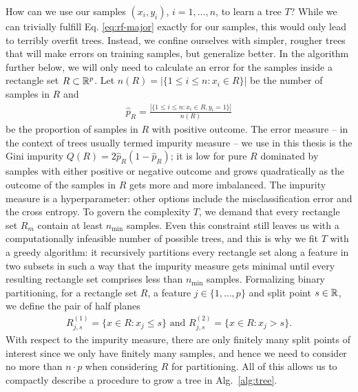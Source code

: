 How can we use our samples $(x_i, y_i)$, $i = 1, \ldots, n$, to learn a tree $T$? While we can 
trivially fulfill Eq. \eqref{eq:rf-major} exactly for our samples, this would only lead to terribly 
overfit trees. Instead, we confine ourselves with simpler, rougher trees that will make errors on 
training samples, but generalize better. 
In the algorithm further below, we will only need to calculate an error for the samples inside a 
rectangle set $R \subset \mathbb{R}^p$. Let $n(R) = |\{ 1 \leq i \leq n: x_i \in R \}|$ be the number of 
samples in $R$ and
\begin{align}
    \hat{p}_R = \frac{|\{ 1 \leq i \leq n: x_i \in R, y_i = 1 \}|}{n(R)}
\end{align}
be the proportion of samples in $R$ with positive outcome. The error measure -- in the context of 
trees usually termed impurity measure -- we use in this thesis
is the Gini impurity $Q(R) = 2 \hat{p}_R (1 - \hat{p}_R)$; it is low for pure $R$ dominated by 
samples with either positive or negative outcome and grows quadratically as the outcome of the 
samples in $R$ gets more and more imbalanced. The impurity measure is a hyperparameter: other 
options include the misclassification error and the cross entropy. To govern the complexity $T$,
we demand that every rectangle set $R_m$ contain at least $n_\text{min}$ samples. Even this 
constraint still leaves us with a computationally infeasible number of possible trees, and this is 
why we fit $T$ with a greedy algorithm: it recursively partitions every rectangle set along a 
feature in two subsets in such a way that the impurity measure gets minimal until every resulting 
rectangle set comprises less than $n_\text{min}$ samples. Formalizing binary partitioning, for a 
rectangle set $R$, a feature $j \in \{1, \ldots, p\}$ and split point $s \in \mathbb{R}$, we define 
the pair of half planes
\begin{align}
    R^{(1)}_{j, s} = \{x \in R: x_j \leq s\} \text{ and } R^{(2)}_{j, s} = \{x \in R: x_j > s\}.
\end{align}
With respect to the impurity measure, there are only finitely many split points of interest since 
we only have finitely many samples, and hence we need to consider no more than $n \cdot p$ when 
considering $R$ for partitioning. All of this allows us to compactly describe a procedure to grow a 
tree in Alg.\ \ref{alg:tree}.


